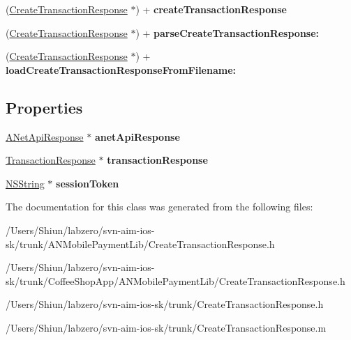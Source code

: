 \begin{DoxyCompactItemize}
\item 
\hypertarget{interface_create_transaction_response_a3bb05bddb57502f370b5fd83d2b426b6}{
(\hyperlink{interface_create_transaction_response}{CreateTransactionResponse} $\ast$) + {\bfseries createTransactionResponse}}
\label{interface_create_transaction_response_a3bb05bddb57502f370b5fd83d2b426b6}

\item 
\hypertarget{interface_create_transaction_response_a759aa109df6c0bf9e46b6289da5190bf}{
(\hyperlink{interface_create_transaction_response}{CreateTransactionResponse} $\ast$) + {\bfseries parseCreateTransactionResponse:}}
\label{interface_create_transaction_response_a759aa109df6c0bf9e46b6289da5190bf}

\item 
\hypertarget{interface_create_transaction_response_a65bc8e23573f17b2749c3b44ba70e5e7}{
(\hyperlink{interface_create_transaction_response}{CreateTransactionResponse} $\ast$) + {\bfseries loadCreateTransactionResponseFromFilename:}}
\label{interface_create_transaction_response_a65bc8e23573f17b2749c3b44ba70e5e7}

\end{DoxyCompactItemize}
\subsection*{Properties}
\begin{DoxyCompactItemize}
\item 
\hypertarget{interface_create_transaction_response_a1d2cdb39a842d770be32133bf6f4ef87}{
\hyperlink{interface_a_net_api_response}{ANetApiResponse} $\ast$ {\bfseries anetApiResponse}}
\label{interface_create_transaction_response_a1d2cdb39a842d770be32133bf6f4ef87}

\item 
\hypertarget{interface_create_transaction_response_a3ff9303e43cf3b592893b185bb39a86f}{
\hyperlink{interface_transaction_response}{TransactionResponse} $\ast$ {\bfseries transactionResponse}}
\label{interface_create_transaction_response_a3ff9303e43cf3b592893b185bb39a86f}

\item 
\hypertarget{interface_create_transaction_response_a92b081acdc2c85e2ed0b4eabc2613d12}{
\hyperlink{class_n_s_string}{NSString} $\ast$ {\bfseries sessionToken}}
\label{interface_create_transaction_response_a92b081acdc2c85e2ed0b4eabc2613d12}

\end{DoxyCompactItemize}


The documentation for this class was generated from the following files:\begin{DoxyCompactItemize}
\item 
/Users/Shiun/labzero/svn-\/aim-\/ios-\/sk/trunk/ANMobilePaymentLib/CreateTransactionResponse.h\item 
/Users/Shiun/labzero/svn-\/aim-\/ios-\/sk/trunk/CoffeeShopApp/ANMobilePaymentLib/CreateTransactionResponse.h\item 
/Users/Shiun/labzero/svn-\/aim-\/ios-\/sk/trunk/CreateTransactionResponse.h\item 
/Users/Shiun/labzero/svn-\/aim-\/ios-\/sk/trunk/CreateTransactionResponse.m\end{DoxyCompactItemize}
